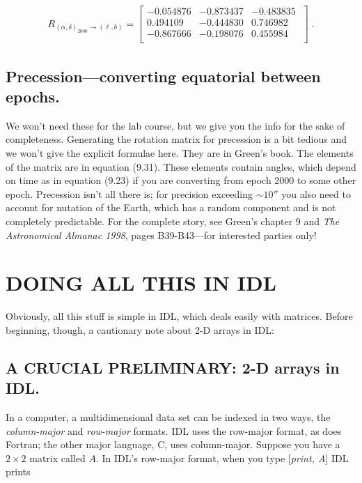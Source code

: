 \documentclass[]{article}
\begin{document}
\begin{eqnarray} 
{R}_{(\alpha, \delta)_{2000} \rightarrow (\ell, b)} = \left[ 
\begin{array}{rrr}
   -0.054876 &  -0.873437 &  -0.483835 \\
    0.494109 &  -0.444830 &   0.746982 \\
   -0.867666 &  -0.198076 &   0.455984 \\
\end{array} 
\; \right] \; .
\end{eqnarray} 

\subsection {Precession---converting equatorial between epochs.}

    We won't need these for the lab course, but we give you the info
for the sake of completeness.  Generating the rotation matrix for
precession is a bit tedious and we won't give the explicit formulae
here.  They are in Green's book.  The elements of the matrix are in
equation (9.31).  These elements contain angles, which depend on time as
in equation (9.23) if you are converting from epoch 2000 to some other
epoch.  Precession isn't all there is; for precision exceeding $\sim
10''$ you also need to account for nutation of the Earth, which has a
random component and is not completely predictable.  For the complete
story, see Green's chapter 9 and {\it The Astronomical Almanac 1998}, 
pages B39-B43---for interested parties only!

\section {DOING ALL THIS IN IDL}

    Obviously, all this stuff is simple in IDL, which deals easily with
matrices. Before beginning, though, a cautionary note about 2-D arrays
in IDL:

\subsection {A CRUCIAL PRELIMINARY: 2-D arrays in IDL.}

    In a computer, a multidimensional data set can be indexed in two
ways, the {\it column-major} and {\it row-major} formats.  IDL uses the
row-major format, as does Fortran; the other major language, C, uses
column-major.  Suppose you have a $2 \times 2$ matrix called ${ A}$. 
In IDL's row-major format, when you type [{\it print, A}] IDL prints
\end{document}
